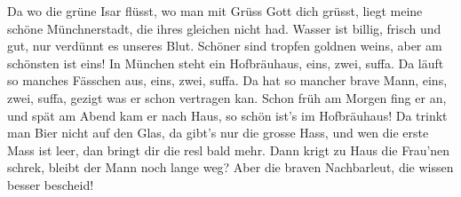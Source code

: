 \beginverse*
Da wo die grüne Isar flüsst,
wo man mit Grüss Gott dich grüsst,
liegt meine schöne Münchnerstadt,
die ihres gleichen nicht had.
Wasser ist billig, frisch und gut,
nur verdünnt es unseres Blut.
Schöner sind tropfen goldnen weins,
aber am schönsten ist eins!
In München steht ein Hofbräuhaus,
eins, zwei, suffa.
Da läuft so manches Fässchen aus,
eins, zwei, suffa.
Da hat so mancher brave Mann,
eins, zwei, suffa,
gezigt was er schon vertragen kan.
Schon früh am Morgen fing er an,
und spät am Abend kam er nach Haus,
so schön ist’s im Hofbräuhaus!
Da trinkt man Bier nicht auf den Glas,
da gibt’s nur die grosse Hass,
und wen die erste Mass ist leer,
dan bringt dir die resl bald mehr.
Dann krigt zu Haus die Frau’nen schrek,
bleibt der Mann noch lange weg?
Aber die braven Nachbarleut,
die wissen besser bescheid!
\endverse
\endsong
